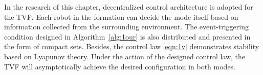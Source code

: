 \begin{remark}
In the research of this chapter, decentralized control architecture is adopted for the TVF. Each robot in the formation can decide the mode itself based on information collected from the surrounding environment. The event-triggering condition designed in Algorithm~\ref{alg:1our} is also distributed and presented in the form of compact sets. Besides, the control law \eqref{eqn:1v} demonstrates stability based on Lyapunov theory. Under the action of the designed control law, the TVF will asymptotically achieve the desired configuration in both modes.
\end{remark}